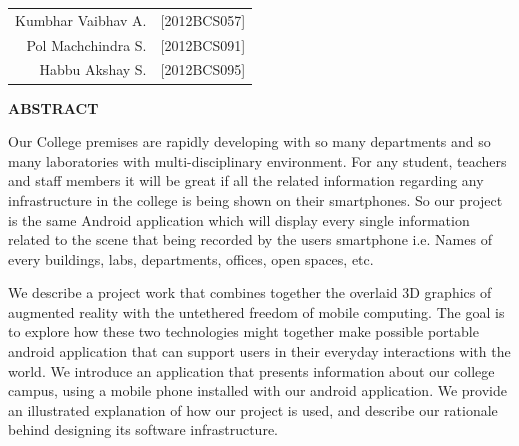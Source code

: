 \documentclass{article}
\begin{document}
\begin{flushright}
\begin{minipage}{.5\linewidth}

\begin{tabular}{rr}
	\large Kumbhar Vaibhav A. &\large [2012BCS057]\\
	\large Pol Machchindra  S. &\large [2012BCS091] \\
	\large Habbu Akshay S. &\large [2012BCS095]\\
\end{tabular}
\end{minipage}
\end{flushright}




\newpage
\begin{center}
{\LARGE \textbf{ ABSTRACT}}\\[1cm]
\end{center}
{\large
	\par Our College premises are rapidly developing with so many departments and so many laboratories with multi-disciplinary environment. For any student, teachers and staff members it will be great if all the related information regarding any infrastructure in the college is being shown on their smartphones. So our project is the same Android application which will display every single information related to the scene that being recorded by the users smartphone i.e. Names of every buildings, labs, departments, offices, open spaces, etc. 
	\par We describe a project work that combines together the overlaid 3D graphics of augmented reality with the untethered freedom of mobile computing. The goal is to explore how these two technologies might together make possible portable android application that can support users in their everyday interactions with the world. We introduce an application that presents information about our college campus, using a mobile phone installed with our android application. We provide an illustrated explanation of how our project is used, and describe our rationale behind designing its software infrastructure.
} 



\newpage
\large
\end{document}
